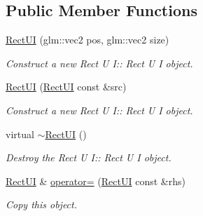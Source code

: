 \subsection*{Public Member Functions}
\begin{DoxyCompactItemize}
\item 
\hyperlink{class_rect_u_i_af6d1044dfd341d4f662527c56556a2b2}{Rect\+UI} (glm\+::vec2 pos, glm\+::vec2 size)
\begin{DoxyCompactList}\small\item\em Construct a new Rect U I\+:\+: Rect U I object. \end{DoxyCompactList}\item 
\hyperlink{class_rect_u_i_af554331fbba88f4f533c50e91ec2a6f6}{Rect\+UI} (\hyperlink{class_rect_u_i}{Rect\+UI} const \&src)
\begin{DoxyCompactList}\small\item\em Construct a new Rect U I\+:\+: Rect U I object. \end{DoxyCompactList}\item 
\mbox{\label{class_rect_u_i_a78ec2d40f750c699946f9d8edcb2ac0e}} 
virtual \hyperlink{class_rect_u_i_a78ec2d40f750c699946f9d8edcb2ac0e}{$\sim$\+Rect\+UI} ()
\begin{DoxyCompactList}\small\item\em Destroy the Rect U I\+:\+: Rect U I object. \end{DoxyCompactList}\item 
\hyperlink{class_rect_u_i}{Rect\+UI} \& \hyperlink{class_rect_u_i_af4b45238eba02383a8a1c1140f3c4a3a}{operator=} (\hyperlink{class_rect_u_i}{Rect\+UI} const \&rhs)
\begin{DoxyCompactList}\small\item\em Copy this object. \end{DoxyCompactList}\end{DoxyCompactItemize}
